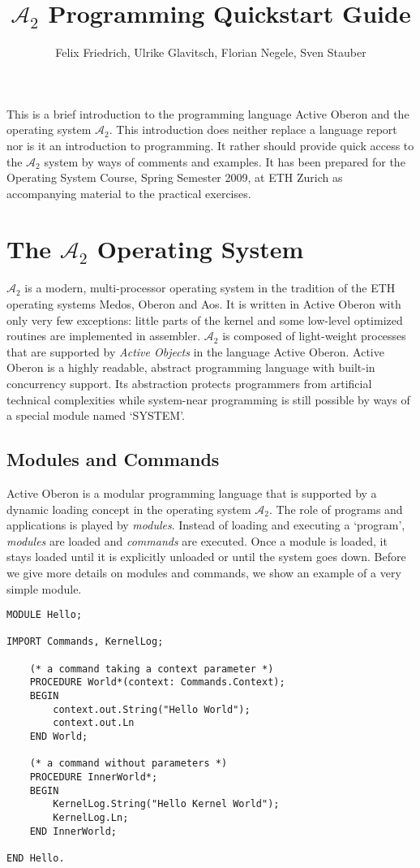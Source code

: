 \documentclass[a4paper,11pt]{article}
\newcommand{\AZ}{\ensuremath{\mathcal{A}_{2}}\xspace}
\begin{document}
\title{\AZ Programming Quickstart Guide}
\author{Felix Friedrich, Ulrike Glavitsch, Florian Negele, Sven Stauber}
\maketitle

This is a brief introduction to the programming language Active Oberon and the operating system \AZ. This introduction does neither replace a language report nor is it an introduction to programming. It rather should provide quick access to the \AZ system by ways of comments and examples. It has been prepared for the Operating System Course, Spring Semester 2009, at ETH Zurich as accompanying material to the practical exercises.

\tableofcontents

\section{The \AZ Operating System}\label{section:TheOperatingSystemA2}
\AZ is a modern, multi-processor operating system in the tradition of the ETH operating systems Medos, Oberon and Aos. It is written in Active Oberon with only very few exceptions: little parts of the kernel and some low-level optimized routines are implemented in assembler. \AZ is composed of light-weight processes that are supported by {\em Active Objects} in the language Active Oberon. Active Oberon is a highly readable, abstract programming language with built-in concurrency support. Its abstraction protects programmers from artificial technical complexities while system-near programming is still possible by ways of a special module named `SYSTEM'.

\subsection{Modules and Commands}\label{section:ModulesAndCommands}
Active Oberon is a modular programming language that is supported by a dynamic loading concept in the operating system \AZ. The role of programs and applications is played by {\em modules}. Instead of loading and executing a `program', {\em modules} are loaded and {\em commands} are executed. Once a module is loaded, it stays loaded until it is explicitly unloaded or until the system goes down. Before we give more details on modules and commands, we show an example of a very simple module.

\begin{lstlisting}[language=Oberon,frame=none,caption=A Simple Oberon Module]
MODULE Hello;

IMPORT Commands, KernelLog;

    (* a command taking a context parameter *)
    PROCEDURE World*(context: Commands.Context);
    BEGIN
        context.out.String("Hello World");
        context.out.Ln
    END World;

    (* a command without parameters *)
    PROCEDURE InnerWorld*;
    BEGIN
        KernelLog.String("Hello Kernel World");
        KernelLog.Ln;
    END InnerWorld;

END Hello.
\end{lstlisting}
\end{document}
